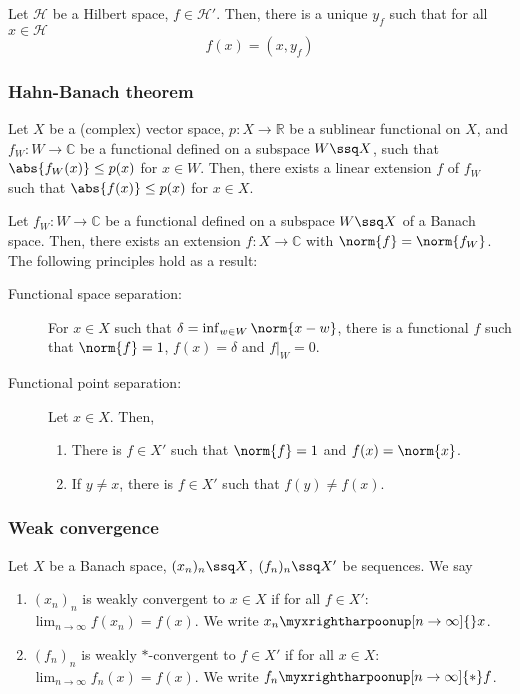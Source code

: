 \begin{thm}
    Let $\mathcal{H}$ be a Hilbert space, $f\in \mathcal{H}'$. Then, there is a unique $y_f$ such that for all $x\in \mathcal{H}$
    \[f(x) = (x,y_f)\]
\end{thm}


\subsubsection{Hahn-Banach theorem}
\begin{thm}
  Let $X$ be a (complex) vector space, $p:X \to \mathbb{R}$ be a sublinear functional on $X$, and $f_W: W\to \mathbb{C}$ be a functional defined on a subspace $W \ssq  X$, such that $\abs{f_W(x)}\leq p(x)$ for $x\in W$. Then, there exists a linear extension $f$ of $f_W$ such that $\abs{f(x)}\leq p(x)$ for $x\in X$.
\end{thm}


\begin{thm}
  Let $f_W:W\to \mathbb{C}$ be a functional defined on a subspace $W \ssq   X$ of a Banach space. Then, there exists an extension $f:X\to \mathbb{C}$ with $\norm{f} = \norm{f_W}$. 
  The following principles hold as a result:
  \begin{description}
    \item [Functional space separation:] For $x\in X$ such that $\delta = \inf_{w\in W}\norm{x-w}$, there is a functional $f$ such that $\norm{f}=1$, $f(x)=\delta$ and $f\vert_W=0$.
    \item[Functional point separation:] Let $x\in X$. Then,
      \begin{enumerate}
        \item There is $f\in X'$ such that $\norm{f}=1$ and $f(x)=\norm{x}$.
        \item If $y\neq x$, there is $f\in X'$ such that $f(y)\neq f(x).$
      \end{enumerate}
  \end{description}
\end{thm}


\subsubsection{Weak convergence}


\begin{defn}
    Let $X$ be a Banach space, $(x_n)_n\ssq X$, $(f_n)_n \ssq X'$ be sequences. We say
    \begin{enumerate}
      \item $(x_n)_n$ is weakly convergent to $x\in X$ if for all $f\in X'$: $\lim_{n\to\infty} f(x_n) = f(x)$. We write $x_n \myxrightharpoonup[n\to\infty]{} x$.
      \item $(f_n)_n$ is weakly $*$-convergent to $f\in X'$ if for all $x\in X$: $\lim_{n \to \infty} f_n(x) = f(x)$. We write $f_n \myxrightharpoonup[n\to\infty]{*}f$.
    \end{enumerate}
\end{defn}


